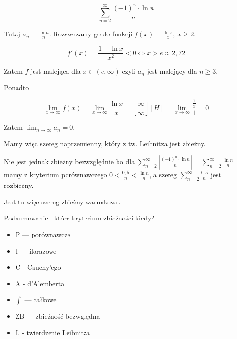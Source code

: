 \begin{przyklad}

$$ \sum\limits_{n=2}^{\infty} \frac{(-1)^n \cdot \ln n}{n} $$

Tutaj $ a_n = \frac{\ln n}{n} $. Rozszerzamy go do funkcji $ f(x) = \frac{\ln x}{x}, \ x \geq 2 $.

$$ f'(x) = \frac{1 - \ln x}{x^2} < 0 \Leftrightarrow x > e \approx 2,72 $$

Zatem $f$ jest malejąca dla $ x \in (e, \infty) $ czyli $a_n$ jest malejący dla $n \geq 3$.

Ponadto

$$ \lim_{x \to \infty} f(x) = \lim_{x \to \infty} \frac{\ln x}{x} = \left[ \frac{\infty}{\infty} \right][H]
= \lim_{x \to \infty} \frac{\frac{1}{x}}{1} = 0 $$

Zatem $ \lim_{n \to \infty} a_n = 0 $.

Mamy więc szereg naprzemienny, który z tw. Leibnitza jest zbieżny.

Nie jest jednak zbieżny bezwzględnie bo dla $ \sum\limits_{n=2}^{\infty} \left| \frac{(-1)^n \cdot \ln n}{n} \right|
= \sum\limits_{n=2}^{\infty} \frac{\ln n}{n} $ mamy z kryterium porównawczego $0 < \frac{0,5}{n} < \frac{\ln n}{n}$,
a szereg $ \sum\limits_{n=2}^{\infty} \frac{0,5}{n} $ jest rozbieżny.

Jest to więc szereg zbieżny warunkowo.
\end{przyklad}

\pagebreak

Podsumowanie : które kryterium zbieżności kiedy?

\begin{itemize}
    \item P --- porównawcze
    \item I --- ilorazowe
    \item C - Cauchy'ego
    \item A - d'Alemberta
    \item $\int$ --- całkowe
    \item ZB --- zbieżność bezwględna
    \item L - twierdzenie Leibnitza \\
\end{itemize}

